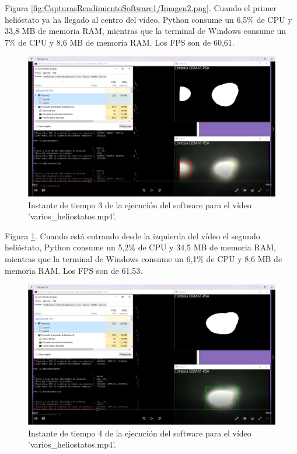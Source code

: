 Figura \ref{fig:CapturasRendimientoSoftware1/Imagen2.png}. Cuando el primer helióstato ya ha llegado al centro del vídeo, Python consume un 6,5\% de CPU y 33,8 MB de memoria RAM, mientras que la terminal de Windows consume un 7\% de CPU y 8,6 MB de memoria RAM. Los FPS son de 60,61.\\[20pt]

\begin{figure}[h!]
  	\centering
	\includegraphics[width=\textwidth]{CapturasRendimientoSoftware1/Imagen3.png}
	\caption{Instante de tiempo 3 de la ejecución del software para el vídeo 'varios\_heliostatos.mp4'.
	\label{fig:CapturasRendimientoSoftware1/Imagen3.png}}
\end{figure}

Figura \ref{fig:CapturasRendimientoSoftware1/Imagen3.png}. Cuando está entrando desde la izquierda del vídeo el segundo helióstato, Python consume un 5,2\% de CPU y 34,5 MB de memoria RAM, mientras que la terminal de Windows consume un 6,1\% de CPU y 8,6 MB de memoria RAM. Los FPS son de 61,53.\\[20pt]

\begin{figure}[h!]
  	\centering
	\includegraphics[width=\textwidth]{CapturasRendimientoSoftware1/Imagen4.png}
	\caption{Instante de tiempo 4 de la ejecución del software para el vídeo 'varios\_heliostatos.mp4'.
	\label{fig:CapturasRendimientoSoftware1/Imagen4.png}}
\end{figure}

